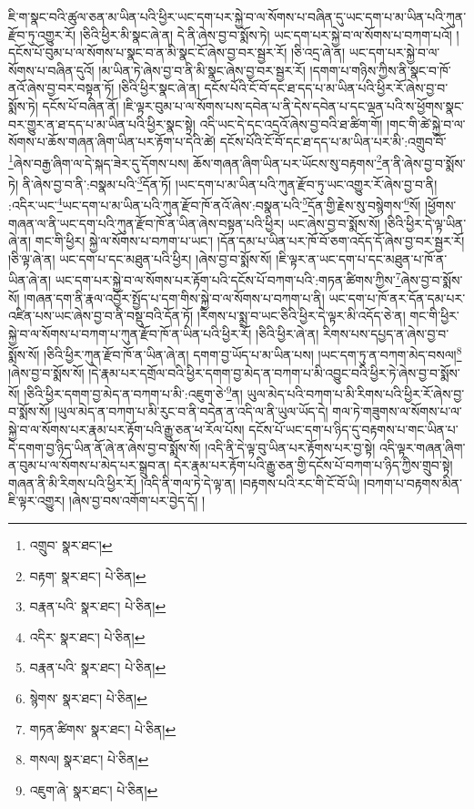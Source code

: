 ཇི་ག་སྣང་བའི་ཚུལ་ཅན་མ་ཡིན་པའི་ཕྱིར་ཡང་དག་པར་སྐྱེ་བ་ལ་སོགས་པ་བཞིན་དུ་ཡང་དག་པ་མ་ཡིན་པའི་ཀུན་རྫོབ་ཏུ་འགྱུར་རོ། །ཅིའི་ཕྱིར་མི་སྣང་ཞེ་ན། དེ་ནི་ཞེས་བྱ་བ་སྨོས་ཏེ། ཡང་དག་པར་སྐྱེ་བ་ལ་སོགས་པ་བཀག་པའོ། །དངོས་པོ་བུམ་པ་ལ་སོགས་པ་སྣང་བ་ན་མི་སྣང་ངོ་ཞེས་བྱ་བར་སྦྱར་རོ། །ཅི་འདྲ་ཞེ་ན། ཡང་དག་པར་སྐྱེ་བ་ལ་སོགས་པ་བཞིན་དུའོ། །མ་ཡིན་ཏེ་ཞེས་བྱ་བ་ནི་མི་སྣང་ཞེས་བྱ་བར་སྦྱར་རོ། །དགག་པ་གཉིས་ཀྱིས་ནི་སྣང་བ་ཁོ་ནའོ་ཞེས་བྱ་བར་བསྟན་ཏོ། །ཅིའི་ཕྱིར་སྣང་ཞེ་ན། དངོས་པོའི་ངོ་བོ་དང་ཐ་དད་པ་མ་ཡིན་པའི་ཕྱིར་རོ་ཞེས་བྱ་བ་སྨོས་ཏེ། དངོས་པོ་བཞིན་ནོ། །ཇི་ལྟར་བུམ་པ་ལ་སོགས་པས་དབེན་པ་ནི་དེས་དབེན་པ་དང་ལྡན་པའི་ས་ཕྱོགས་སྣང་བར་གྱུར་ན་ཐ་དད་པ་མ་ཡིན་པའི་ཕྱིར་སྣང་སྟེ། འདི་ཡང་དེ་དང་འདྲའོ་ཞེས་བྱ་བའི་ཐ་ཚིག་གོ། །གང་གི་ཚེ་སྐྱེ་བ་ལ་སོགས་པ་ཆོས་གཞན་ཞིག་ཡིན་པར་རྟོག་པ་དེའི་ཚེ། དངོས་པོའི་ངོ་བོ་དང་ཐ་དད་པ་མ་ཡིན་པར་མི་:འགྲུབ་བོ་\footnote{འགྲུབ་  སྣར་ཐང་། }ཞེས་བརྒྱ་ཞིག་ལ་དེ་སྐད་ཟེར་དུ་དོགས་པས། ཆོས་གཞན་ཞིག་ཡིན་པར་ཡོངས་སུ་བརྟགས་\footnote{བརྟག་  སྣར་ཐང་།  པེ་ཅིན། }ན་ནི་ཞེས་བྱ་བ་སྨོས་ཏེ། ནི་ཞེས་བྱ་བ་ནི་:བསྣམ་པའི་\footnote{བརྣན་པའི་  སྣར་ཐང་།  པེ་ཅིན། }དོན་ཏོ། །ཡང་དག་པ་མ་ཡིན་པའི་ཀུན་རྫོབ་ཏུ་ཡང་འགྱུར་རོ་ཞེས་བྱ་བ་ནི། :འདིར་ཡང་\footnote{འདིར་  སྣར་ཐང་།  པེ་ཅིན། }ཡང་དག་པ་མ་ཡིན་པའི་ཀུན་རྫོབ་ཁོ་ནའོ་ཞེས་:བསྣན་པའི་\footnote{བརྣན་པའི་  སྣར་ཐང་།  པེ་ཅིན། }དོན་གྱི་རྗེས་སུ་བསྙེགས་\footnote{སྙེགས་  སྣར་ཐང་།  པེ་ཅིན། }སོ། །ཕྱོགས་གཞན་ལ་ནི་ཡང་དག་པའི་ཀུན་རྫོབ་ཁོ་ན་ཡིན་ཞེས་བསྟན་པའི་ཕྱིར། ཡང་ཞེས་བྱ་བ་སྨོས་སོ། །ཅིའི་ཕྱིར་དེ་ལྟ་ཡིན་ཞེ་ན། གང་གི་ཕྱིར། སྐྱེ་ལ་སོགས་པ་བཀག་པ་ཡང་། །དོན་དམ་པ་ཡིན་པར་ཁོ་བོ་ཅག་འདོད་དོ་ཞེས་བྱ་བར་སྦྱར་རོ། །ཅི་ལྟ་ཞེ་ན། ཡང་དག་པ་དང་མཐུན་པའི་ཕྱིར། །ཞེས་བྱ་བ་སྨོས་སོ། །ཇི་ལྟར་ན་ཡང་དག་པ་དང་མཐུན་པ་ཁོ་ན་ཡིན་ཞེ་ན། ཡང་དག་པར་སྐྱེ་བ་ལ་སོགས་པར་རྟོག་པའི་དངོས་པོ་བཀག་པའི་:གཏན་ཚིགས་ཀྱིས་\footnote{གཏན་ཚིགས་  སྣར་ཐང་།  པེ་ཅིན། }ཞེས་བྱ་བ་སྨོས་སོ། །གཞན་དག་ནི་རྣལ་འབྱོར་སྤྱོད་པ་དག་གིས་སྐྱེ་བ་ལ་སོགས་པ་བཀག་པ་ནི། ཡང་དག་པ་ཁོ་ནར་དོན་དམ་པར་འཛིན་པས་ཡང་ཞེས་བྱ་བ་ནི་བསྡུ་བའི་དོན་ཏོ། །རིགས་པ་སྨྲ་བ་ཡང་ཅིའི་ཕྱིར་དེ་ལྟར་མི་འདོད་ཅེ་ན། གང་གི་ཕྱིར་སྐྱེ་བ་ལ་སོགས་པ་བཀག་པ་ཀུན་རྫོབ་ཁོ་ན་ཡིན་པའི་ཕྱིར་རོ། །ཅིའི་ཕྱིར་ཞེ་ན། རིགས་པས་དཔྱད་ན་ཞེས་བྱ་བ་སྨོས་སོ། །ཅིའི་ཕྱིར་ཀུན་རྫོབ་ཁོ་ན་ཡིན་ཞེ་ན། དགག་བྱ་ཡོད་པ་མ་ཡིན་པས། །ཡང་དག་ཏུ་ན་བཀག་མེད་བསལ།\footnote{གསལ།  སྣར་ཐང་།  པེ་ཅིན། } །ཞེས་བྱ་བ་སྨོས་སོ། །དེ་རྣམ་པར་དགྲོལ་བའི་ཕྱིར་དགག་བྱ་མེད་ན་བཀག་པ་མི་འབྱུང་བའི་ཕྱིར་ཏེ་ཞེས་བྱ་བ་སྨོས་སོ། །ཅིའི་ཕྱིར་དགག་བྱ་མེད་ན་བཀག་པ་མི་:འཇུག་ཅེ་\footnote{འཇུག་ཞེ་  སྣར་ཐང་།  པེ་ཅིན། }ན། ཡུལ་མེད་པའི་བཀག་པ་མི་རིགས་པའི་ཕྱིར་རོ་ཞེས་བྱ་བ་སྨོས་སོ། །ཡུལ་མེད་ན་བཀག་པ་མི་རུང་བ་ནི་བདེན་ན་འདི་ལ་ནི་ཡུལ་ཡོད་དེ། གལ་ཏེ་གཟུགས་ལ་སོགས་པ་ལ་སྐྱེ་བ་ལ་སོགས་པར་རྣམ་པར་རྟོག་པའི་རྒྱུ་ཅན་ཕ་རོལ་པོས། དངོས་པོ་ཡང་དག་པ་ཉིད་དུ་བརྟགས་པ་གང་ཡིན་པ་དེ་དགག་བྱ་ཉིད་ཡིན་ནོ་ཞེ་ན་ཞེས་བྱ་བ་སྨོས་སོ། །འདི་ནི་དེ་ལྟ་བུ་ཡིན་པར་རྟོགས་པར་བྱ་སྟེ། འདི་ལྟར་གཞན་ཞིག་ན་བུམ་པ་ལ་སོགས་པ་མེད་པར་སྒྲུབ་ན། དེར་རྣམ་པར་རྟོག་པའི་རྒྱུ་ཅན་གྱི་དངོས་པོ་བཀག་པ་ཉིད་ཀྱིས་གྲུབ་སྟེ། གཞན་ནི་མི་རིགས་པའི་ཕྱིར་རོ། །འདི་ནི་གལ་ཏེ་དེ་ལྟ་ན། །བརྟགས་པའི་རང་གི་ངོ་བོ་ཡི། །བཀག་པ་བརྟགས་མིན་ཇི་ལྟར་འགྱུར། །ཞེས་བྱ་བས་འགོག་པར་བྱེད་དོ། །
